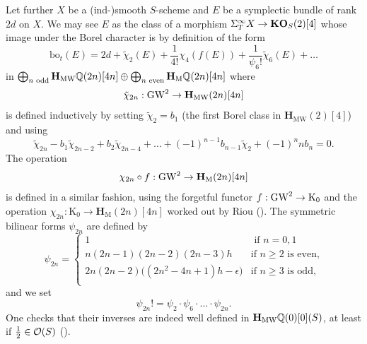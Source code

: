 Let further $X$ be a (ind-)smooth $S$-scheme and $E$ be a symplectic bundle of rank $2d$ on $X$. We may see $E$ as the class of a morphism $\Sigma_T^{\infty}X\to \mathbf{KO}_{S}(2)[4]$ whose image under the Borel character is by definition of the form
\begin{equation}\label{eq:Borelchar}
\mathrm{bo}_t(E)=2d+\tilde\chi_2(E)+\frac 1{4!}\chi_4(f(E))+\frac 1{\psi_6!}\tilde\chi_6(E)+\ldots
\end{equation}
in $\bigoplus_{n \text{ odd}} \mathbf{H}_\mathrm{MW}\mathbb{Q}(2n)[4n] \oplus \bigoplus_{n \text{ even}} \mathbf{H}_{\mathrm M} \mathbb{Q}(2n)[4n]$ where 
\[
\tilde\chi_{2n}:\operatorname{GW}^2\to \mathbf{H}_\mathrm{MW}(2n)[4n]
\]
is defined inductively by setting $\tilde\chi_{2}=b_1$ (the first Borel class in $\mathbf{H}_\mathrm{MW}(2)[4]$) and using
\begin{equation}
\tilde \chi_{2n}-b_1\tilde \chi_{2n-2}+b_2\tilde \chi_{2n-4}
+ \hdots +(-1)^{n-1}b_{n-1}\tilde \chi_2+(-1)^nnb_n=0.
\end{equation}
The operation
\[
\chi_{2n}\circ f:\operatorname{GW}^2\to \mathbf{H}_\mathrm{M}(2n)[4n]
\]
is defined in a similar fashion, using the forgetful functor $f:\operatorname{GW}^2\to \mathrm{K}_0$ and the operation $\chi_{2n}:\mathrm{K}_0\to  \mathbf{H}_\mathrm{M}(2n)[4n]$ worked out by Riou (\cite[Remark 6.2.2.3]{Riou}). The symmetric bilinear forms $\psi_{2n}$ are defined by 
\[
\psi_{2n}=\begin{cases}
1 & \text{ if $n=0,1$} \\
n(2n-1)(2n-2)(2n-3)h & \text{if $n\geq 2$ is even,} \\
2n(2n-2)\big((2n^2-4n+1)h-\epsilon\big) & \text{if $n\geq 3$ is odd,} \\
\end{cases}
\]
and we set
\[
\psi_{2n}!=\psi_2 \cdot \psi_6 \cdot \hdots \cdot \psi_{2n}.
\]
One checks that their inverses are indeed well defined in $\mathbf{H}_\mathrm{MW}\mathbb{Q}(0)[0](S)$, at least if $\frac 12\in \mathcal O(S)$ (\cite[Theorem 4.3.2]{DF3}).


